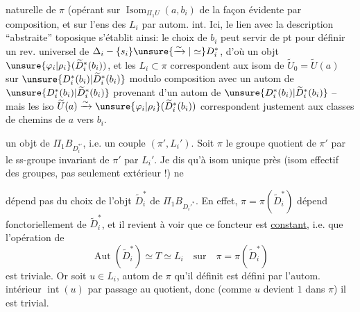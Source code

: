 
naturelle de \(\pi\) (opérant sur \(\operatorname{Isom}_{\Pi_1U}(a,b_i)\) de la façon évidente par composition, et sur l'ens des \(L_i\) par autom. int.
 Ici, le  lien avec la description ``abstraite'' toposique s'établit ainsi: le choix de \(b_i\) peut servir de pt  pour définir un rev. universel de \(\Delta_i-\{s_i\}\unsure{\xrightarrow{\sim}|\simeq}D_i^*\), d'où un objt \(\unsure{\varphi_i|\rho_i}(\widetilde D_i^*(b_i))\), et  les \(L_i\subset\pi\) correspondent  aux isom de \(\widetilde U_0=\widetilde U(a)\) sur \(\unsure{D_i^*(b_i)|\widetilde D_i^*(b_i)}\) modulo composition avec un autom de \(\unsure{D_i^*(b_i)|\widetilde D_i^*(b_i)}\) provenant d'un autom de \(\unsure{D_i^*(b_i)|\widetilde D_i^*(b_i)}\) -- mais les iso  \(\widetilde U(a)\xrightarrow{\sim}\unsure{\varphi_i|\rho_i}(\widetilde D_i^*(b_i))\) correspondent justement aux classes de chemins de \(a\) vers \(b_i\).

 un objt de \(\Pi_1B_{D_i^{*'}}\), i.e. un couple \((\pi',L_i')\). Soit \(\pi\) le groupe quotient de \(\pi'\) par le ss-groupe invariant de \(\pi'\)   par \(L_i'\). Je dis \margin{\(\Vert\)} qu'à isom unique près (isom effectif des groupes, pas seulement extérieur !)  ne


dépend pas du choix de l'objt \(\widetilde D_i^*\) de \(\Pi_1B_{D_i'^*}\). En effet, \(\pi=\pi(\widetilde D_i^*)\) dépend fonctoriellement de \(\widetilde D_i^*\), et il revient à voir que ce foncteur est \uline{constant}, i.e. que l'opération de
\[
\operatorname{Aut}(\widetilde D_i^*)\simeq T\simeq L_i
\quad\text{sur}\quad
\pi=\pi(\widetilde D_i^*)
\]
est triviale. Or soit \(u\in L_i\),  autom de \(\pi\) qu'il définit est défini par l'autom. intérieur \(\operatorname{int}(u)\) par passage au quotient, donc (comme \(u\) devient \(1\) dans \(\pi\)) il est trivial. 

